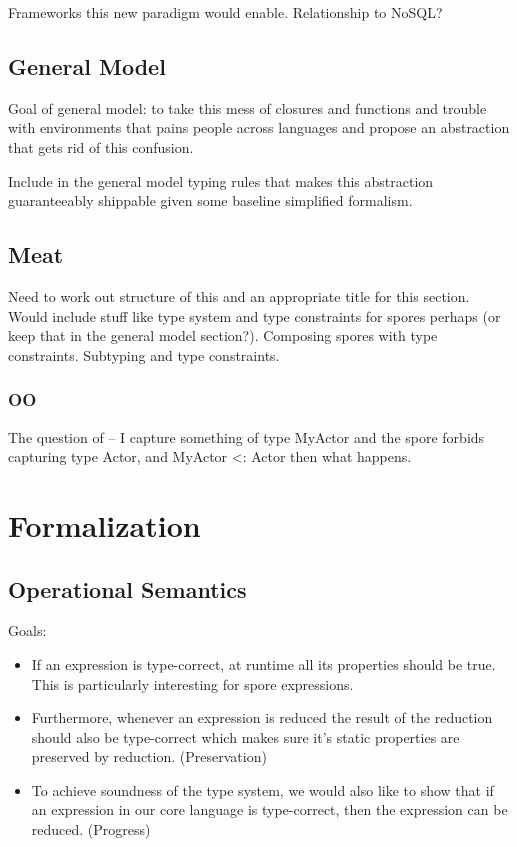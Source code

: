 \documentclass{llncs}
\begin{document}
Frameworks this new paradigm would enable. Relationship to NoSQL?

\subsection{General Model}

Goal of general model: to take this mess of closures and functions and trouble with environments that pains people across languages and propose an abstraction that gets rid of this confusion.

Include in the general model typing rules that makes this abstraction guaranteeably shippable
given some baseline simplified formalism.

\subsection{Meat}

Need to work out structure of this and an appropriate title for this section. Would include stuff like type system and type constraints for spores perhaps (or keep that in the general model section?). Composing spores with type constraints. Subtyping and type constraints.

\subsubsection{OO}

The question of -- I capture something of type MyActor
and the spore forbids capturing type Actor, and MyActor <: Actor
then what happens.

\section{Formalization}\label{sec:formal}

\subsection{Operational Semantics}\label{sec:opsem}

Goals:
\begin{itemize}
\item If an expression is type-correct, at runtime all its properties should be true. This is particularly 
  interesting for spore expressions.
\item Furthermore, whenever an expression is reduced the result of the reduction should also be type-correct which 
  makes sure it's static properties are preserved by reduction. (Preservation)
\item To achieve soundness of the type system, we would also like to show that if an expression in our core 
  language is type-correct, then the expression can be reduced. (Progress)
\end{itemize}
\end{document}
